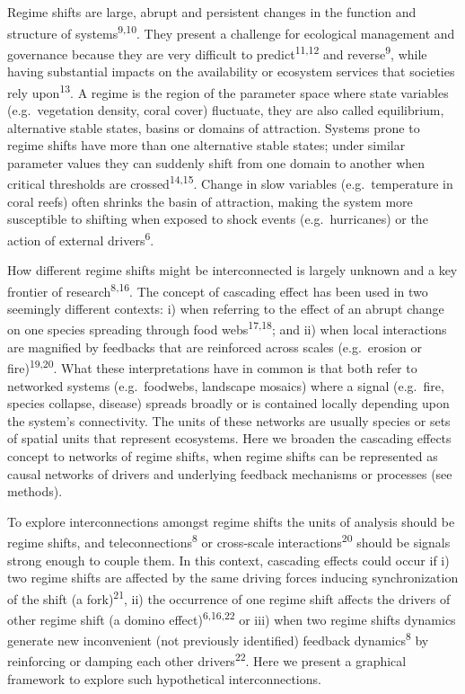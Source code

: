 \documentclass[9pt,]{article}
\begin{document}
Regime shifts are large, abrupt and persistent changes in the function
and structure of systems\textsuperscript{9,10}. They present a challenge
for ecological management and governance because they are very difficult
to predict\textsuperscript{11,12} and reverse\textsuperscript{9}, while
having substantial impacts on the availability or ecosystem services
that societies rely upon\textsuperscript{13}. A regime is the region of
the parameter space where state variables (e.g.~vegetation density,
coral cover) fluctuate, they are also called equilibrium, alternative
stable states, basins or domains of attraction. Systems prone to regime
shifts have more than one alternative stable states; under similar
parameter values they can suddenly shift from one domain to another when
critical thresholds are crossed\textsuperscript{14,15}. Change in slow
variables (e.g.~temperature in coral reefs) often shrinks the basin of
attraction, making the system more susceptible to shifting when exposed
to shock events (e.g.~hurricanes) or the action of external
drivers\textsuperscript{6}.

How different regime shifts might be interconnected is largely unknown
and a key frontier of research\textsuperscript{8,16}. The concept of
cascading effect has been used in two seemingly different contexts: i)
when referring to the effect of an abrupt change on one species
spreading through food webs\textsuperscript{17,18}; and ii) when local
interactions are magnified by feedbacks that are reinforced across
scales (e.g.~erosion or fire)\textsuperscript{19,20}. What these
interpretations have in common is that both refer to networked systems
(e.g.~foodwebs, landscape mosaics) where a signal (e.g.~fire, species
collapse, disease) spreads broadly or is contained locally depending
upon the system's connectivity. The units of these networks are usually
species or sets of spatial units that represent ecosystems. Here we
broaden the cascading effects concept to networks of regime shifts, when
regime shifts can be represented as causal networks of drivers and
underlying feedback mechanisms or processes (see methods).

To explore interconnections amongst regime shifts the units of analysis
should be regime shifts, and teleconnections\textsuperscript{8} or
cross-scale interactions\textsuperscript{20} should be signals strong
enough to couple them. In this context, cascading effects could occur if
i) two regime shifts are affected by the same driving forces inducing
synchronization of the shift (a fork)\textsuperscript{21}, ii) the
occurrence of one regime shift affects the drivers of other regime shift
(a domino effect)\textsuperscript{6,16,22} or iii) when two regime
shifts dynamics generate new inconvenient (not previously identified)
feedback dynamics\textsuperscript{8} by reinforcing or damping each
other drivers\textsuperscript{22}. Here we present a graphical framework
to explore such hypothetical interconnections.
\end{document}
